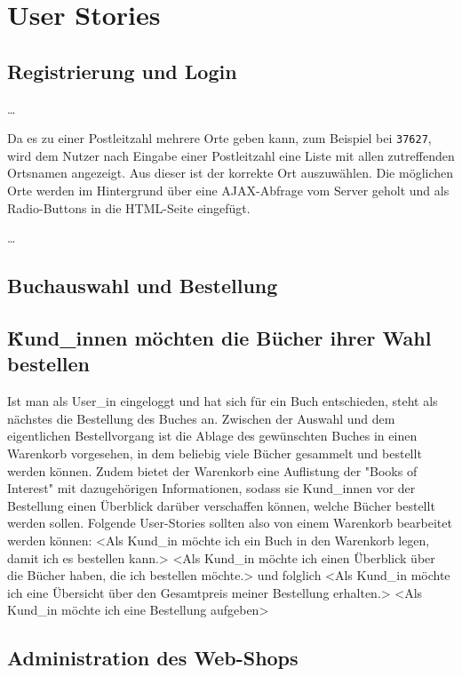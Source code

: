 \section{User Stories}
	\subsection{Registrierung und Login}
	\dots
	
	Da es zu einer Postleitzahl mehrere Orte geben kann, zum Beispiel bei \lstinline|37627|, wird dem Nutzer nach Eingabe einer Postleitzahl eine Liste mit allen zutreffenden Ortsnamen angezeigt. Aus dieser ist der korrekte Ort auszuwählen. Die möglichen Orte werden im Hintergrund über eine AJAX-Abfrage vom Server geholt und als Radio-Buttons in die HTML-Seite eingefügt.
	
	\dots
	
	\subsection{Buchauswahl und Bestellung}
	\subsection{\"Kund_innen möchten die Bücher ihrer Wahl bestellen}
	 Ist man als User_in eingeloggt und hat sich für ein Buch entschieden, steht als nächstes die Bestellung des Buches an. Zwischen der Auswahl und dem eigentlichen Bestellvorgang ist die Ablage des gewünschten Buches in einen Warenkorb vorgesehen, in dem beliebig viele Bücher gesammelt und bestellt werden können. Zudem bietet der Warenkorb eine Auflistung der "Books of Interest" mit dazugehörigen Informationen, sodass sie Kund_innen vor der Bestellung einen Überblick darüber verschaffen können, welche Bücher bestellt werden sollen. Folgende User-Stories sollten also von einem Warenkorb bearbeitet werden können:
	 <Als Kund_in möchte ich ein Buch in den Warenkorb legen, damit ich es bestellen kann.>
	 <Als Kund_in möchte ich einen Überblick über die Bücher haben, die ich bestellen möchte.>
	 und folglich <Als Kund_in möchte ich eine Übersicht über den Gesamtpreis meiner Bestellung erhalten.>
	 <Als Kund_in möchte ich eine Bestellung aufgeben>
	 
	\subsection{Administration des Web-Shops}
